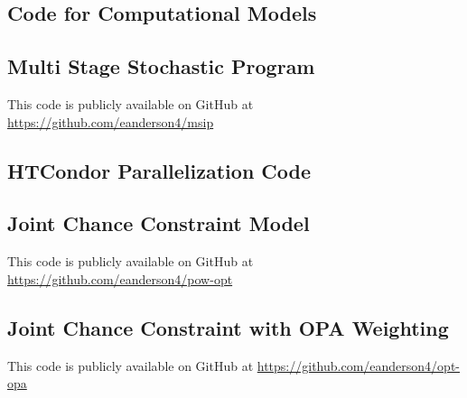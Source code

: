 \begin{appendices}
\chapter{Code for Computational Models}

\section{Multi Stage Stochastic Program}
This code is publicly available on GitHub at
\url{https://github.com/eanderson4/msip}

\section{HTCondor Parallelization Code}

\linespread{1}
\scriptsize






%







\linespread{2}


\section{Joint Chance Constraint Model}
This code is publicly available on GitHub at
\url{https://github.com/eanderson4/pow-opt}

\section{Joint Chance Constraint with OPA Weighting}
This code is publicly available on GitHub at
\url{https://github.com/eanderson4/opt-opa}


\end{appendices}


